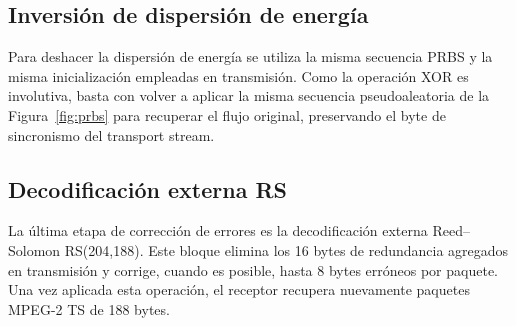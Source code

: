 \subsection{Inversión de dispersión de energía}

Para deshacer la dispersión de energía se utiliza la misma secuencia PRBS y la misma inicialización empleadas en transmisión. Como la operación XOR es involutiva, basta con volver a aplicar la misma secuencia pseudoaleatoria de la Figura~\ref{fig:prbs} para recuperar el flujo original, preservando el byte de sincronismo del transport stream.

\subsection{Decodificación externa RS}

La última etapa de corrección de errores es la decodificación externa Reed--Solomon RS(204,188). Este bloque elimina los 16 bytes de redundancia agregados en transmisión y corrige, cuando es posible, hasta 8 bytes erróneos por paquete. Una vez aplicada esta operación, el receptor recupera nuevamente paquetes MPEG-2 TS de 188 bytes.
